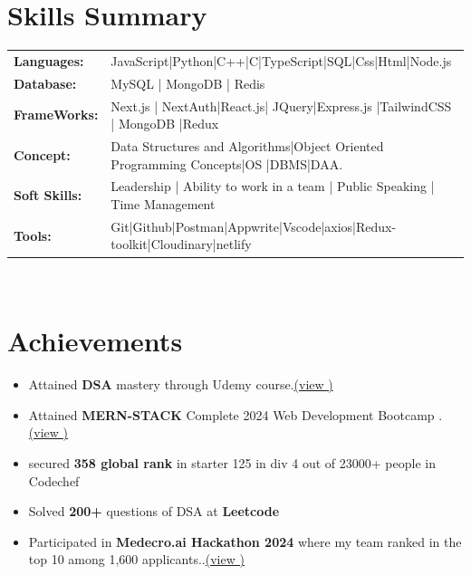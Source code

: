 \documentclass[letterpaper,10pt]{article} %
\newcommand{\cvitem}[1]{
  \item\small{
    {#1\vspace{-2pt}}
  }
}
\newcommand{\cvitemstart}{\begin{itemize}\justifying}
\newcommand{\cvitemend}{\end{itemize}\vspace{-6pt}}
\begin{document}
\section*{Skills Summary}
\vspace{-2pt}
\begin{tabular}{ @{} >{\bfseries}l @{\hspace{6ex}} l }

Languages: & JavaScript|Python|C++|C|TypeScript|SQL|Css|Html|Node.js
\\
Database: &  MySQL | MongoDB | Redis 
\\
FrameWorks: & Next.js | NextAuth|React.js| JQuery|Express.js |TailwindCSS | MongoDB |Redux
\\
Concept: & Data Structures and Algorithms|Object Oriented Programming Concepts|OS |DBMS|DAA.
\\
Soft Skills: & Leadership | Ability to work in a team | Public Speaking | Time Management
\\
Tools: & Git|Github|Postman|Appwrite|Vscode|axios|Redux-toolkit|Cloudinary|netlify
\end{tabular}\\
\vspace{-9pt}

\section{Achievements}
\cvitemstart  
\vspace{1pt}
  \cvitem{ Attained \textbf {DSA }mastery through Udemy course.\href{https://udemy-certificate.s3.amazonaws.com/image/UC-9693219d-085d-404c-adf3-f943a929dd53.jpg}{(view \faExternalLink*)}
}
\cvitemend
\vspace{-9pt}
\cvitemstart   
  \cvitem{ Attained \textbf {MERN-STACK} Complete 2024 Web Development Bootcamp
.\href{https://udemy-certificate.s3.amazonaws.com/image/UC-1cc7d78b-ee48-45c8-ba4a-26be2bba92c8.jpg}{(view \faExternalLink*)}
}
\cvitemend
\vspace{-9pt}
\cvitemstart   
  \cvitem{secured \textbf{358 global rank} in starter 125 in div 4 out of 23000+ people in Codechef}
\cvitemend
\vspace{-9pt}
\cvitemstart   
  \cvitem{Solved \textbf{200+} questions of DSA at  \textbf{Leetcode}
}
\cvitemend
\vspace{-9pt}
\cvitemstart   
  \cvitem{Participated in \textbf{Medecro.ai Hackathon 2024} where my team ranked in the top 10 among 1,600 applicants..\href{https://drive.google.com/file/d/18becaaeP6snzd1TeXW10usLLK0kVPrZ9/view?usp=drive_link}{(view \faExternalLink*)}
}
\cvitemend
\end{document}
